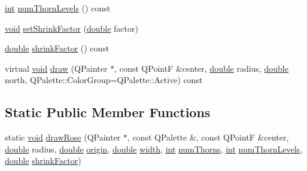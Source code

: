 \begin{DoxyCompactItemize}
\hyperlink{ioapi_8h_a787fa3cf048117ba7123753c1e74fcd6}{int} \hyperlink{class_qwt_simple_compass_rose_a8fa418ee344d934d556fa5719cd5ece5}{num\-Thorn\-Levels} () const 
\item 
\hyperlink{group___u_a_v_objects_plugin_ga444cf2ff3f0ecbe028adce838d373f5c}{void} \hyperlink{class_qwt_simple_compass_rose_afaf84e19eb8eb2360306860b02d46cfc}{set\-Shrink\-Factor} (\hyperlink{_super_l_u_support_8h_a8956b2b9f49bf918deed98379d159ca7}{double} factor)
\item 
\hyperlink{_super_l_u_support_8h_a8956b2b9f49bf918deed98379d159ca7}{double} \hyperlink{class_qwt_simple_compass_rose_a49ac7941c4a09f5a33e660b130d7bc2e}{shrink\-Factor} () const 
\item 
virtual \hyperlink{group___u_a_v_objects_plugin_ga444cf2ff3f0ecbe028adce838d373f5c}{void} \hyperlink{class_qwt_simple_compass_rose_aa7541cd32c88b222731da37588e67bf3}{draw} (Q\-Painter $\ast$, const Q\-Point\-F \&center, \hyperlink{_super_l_u_support_8h_a8956b2b9f49bf918deed98379d159ca7}{double} radius, \hyperlink{_super_l_u_support_8h_a8956b2b9f49bf918deed98379d159ca7}{double} north, Q\-Palette\-::\-Color\-Group=Q\-Palette\-::\-Active) const 
\end{DoxyCompactItemize}
\subsection*{Static Public Member Functions}
\begin{DoxyCompactItemize}
\item 
static \hyperlink{group___u_a_v_objects_plugin_ga444cf2ff3f0ecbe028adce838d373f5c}{void} \hyperlink{class_qwt_simple_compass_rose_a914bb202a844f0b11a18a0296e170025}{draw\-Rose} (Q\-Painter $\ast$, const Q\-Palette \&, const Q\-Point\-F \&center, \hyperlink{_super_l_u_support_8h_a8956b2b9f49bf918deed98379d159ca7}{double} radius, \hyperlink{_super_l_u_support_8h_a8956b2b9f49bf918deed98379d159ca7}{double} \hyperlink{ioapi_8h_a6ad5e17860121e666df109329b95c83e}{origin}, \hyperlink{_super_l_u_support_8h_a8956b2b9f49bf918deed98379d159ca7}{double} \hyperlink{glext_8h_a76aaa5c50746272e7d2de9aece921757}{width}, \hyperlink{ioapi_8h_a787fa3cf048117ba7123753c1e74fcd6}{int} \hyperlink{class_qwt_simple_compass_rose_a7c3270789e94e94b8d515b04372bfe0b}{num\-Thorns}, \hyperlink{ioapi_8h_a787fa3cf048117ba7123753c1e74fcd6}{int} \hyperlink{class_qwt_simple_compass_rose_a8fa418ee344d934d556fa5719cd5ece5}{num\-Thorn\-Levels}, \hyperlink{_super_l_u_support_8h_a8956b2b9f49bf918deed98379d159ca7}{double} \hyperlink{class_qwt_simple_compass_rose_a49ac7941c4a09f5a33e660b130d7bc2e}{shrink\-Factor})
\end{DoxyCompactItemize}


